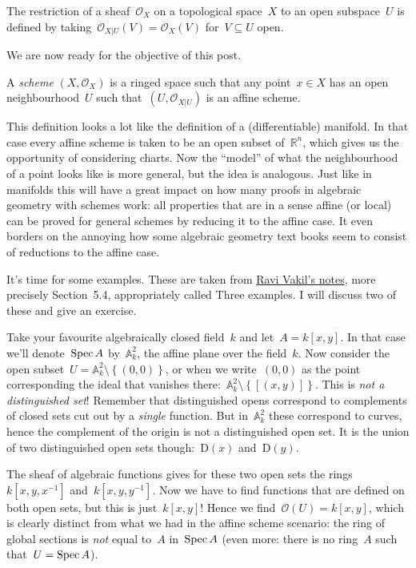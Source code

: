 \begin{definition}
  The restriction of a sheaf~$\mathcal{O}_X$ on a topological space~$X$ to an open subspace~$U$ is defined by taking~$\mathcal{O}_{X|U}(V)=\mathcal{O}_X(V)$ for~$V\subseteq U$ open.
\end{definition}

We are now ready for the objective of this post.

\begin{definition}
  A \emph{scheme} $(X,\mathcal{O}_X)$ is a ringed space such that any point~$x\in X$ has an open neighbourhood~$U$ such that~$(U,\mathcal{O}_{X|U})$ is an affine scheme.
\end{definition}

This definition looks a lot like the definition of a (differentiable) manifold. In that case every affine scheme is taken to be an open subset of~$\mathbb{R}^n$, which gives us the opportunity of considering charts. Now the ``model'' of what the neighbourhood of a point looks like is more general, but the idea is analogous. Just like in manifolds this will have a great impact on how many proofs in algebraic geometry with schemes work: all properties that are in a sense affine (or local) can be proved for general schemes by reducing it to the affine case. It even borders on the annoying how some algebraic geometry text books seem to consist of reductions to the affine case.

It's time for some examples. These are taken from \iftex\cite{foag}\fi\ifblog \href{http://math216.wordpress.com}{Ravi Vakil's notes}\fi, more precisely Section~5.4, appropriately called Three examples. I will discuss two of these and give an exercise.

\begin{example}
  Take your favourite algebraically closed field~$k$ and let~$A=k[x,y]$. In that case we'll denote~$\operatorname{Spec} A$ by~$\mathbb{A}^2_k$, the affine plane over the field~$k$. Now consider the open subset~$U=\mathbb{A}^2_k\setminus\left\{ (0,0) \right\}$, or when we write~$(0,0)$ as the point corresponding the ideal that vanishes there:~$\mathbb{A}^2_k\setminus\left\{ \left[ (x,y) \right] \right\}$. This is \emph{not a distinguished set}! Remember that distinguished opens correspond to complements of closed sets cut out by a \emph{single} function. But in~$\mathbb{A}^2_k$ these correspond to curves, hence the complement of the origin is not a distinguished open set. It is the union of two distinguished open sets though:~$\mathrm{D}(x)$ and~$\mathrm{D}(y)$.

  The sheaf of algebraic functions gives for these two open sets the rings~$k[x,y,x^{-1}]$ and~$k[x,y,y^{-1}]$. Now we have to find functions that are defined on both open sets, but this is just~$k[x,y]$! Hence we find~$\mathcal{O}(U)=k[x,y]$, which is clearly distinct from what we had in the affine scheme scenario: the ring of global sections is \emph{not} equal to~$A$ in~$\operatorname{Spec} A$ (even more: there is no ring~$A$ such that~$U=\operatorname{Spec} A$).
\end{example}

